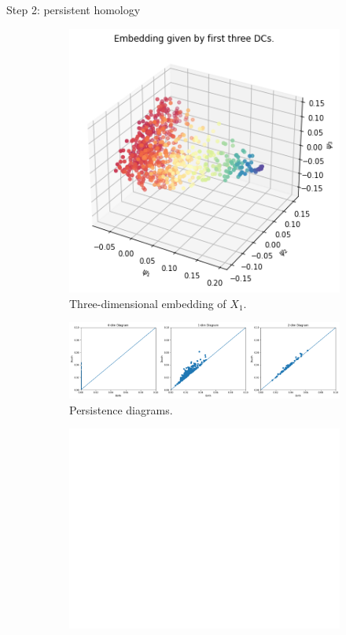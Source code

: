 \documentclass[xcolor={dvipsnames,svgnames}]{beamer}
\begin{document}
\begin{frame}{Step 2: persistent homology}
\begin{figure}[H]
\centering
\begin{subfigure}[b]{0.2\textwidth}
    \includegraphics[width=\textwidth]{figures/X1_embedding.png}
    \caption{Three-dimensional embedding of $X_1$.}
\end{subfigure}
\hfill
\begin{subfigure}[b]{0.75\textwidth}
    \includegraphics[width=\textwidth]{figures/X1_H0.png}
    \caption{Persistence diagrams.}
\end{subfigure}
\begin{subfigure}[b]{0.25\textwidth}
\includegraphics[width=\textwidth]{figures/white.png} 

\end{subfigure}
\end{figure}
\end{frame}
\end{document}
